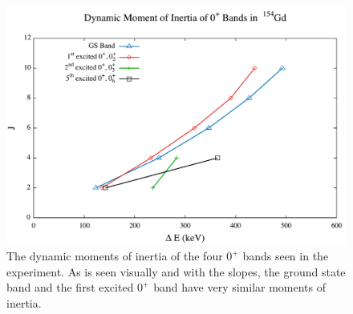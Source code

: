 \begin{figure}[!]
    \centering
    \includegraphics[scale=0.45]{Discussion/154_Dynamic0.pdf}
    \caption{The dynamic moments of inertia of the four $0^+$ bands seen in the experiment. As is seen visually and with the slopes, the ground state band and the first excited $0^+$ band have very similar moments of inertia.}
    \label{fig:154_Dynamic0}
\end{figure}